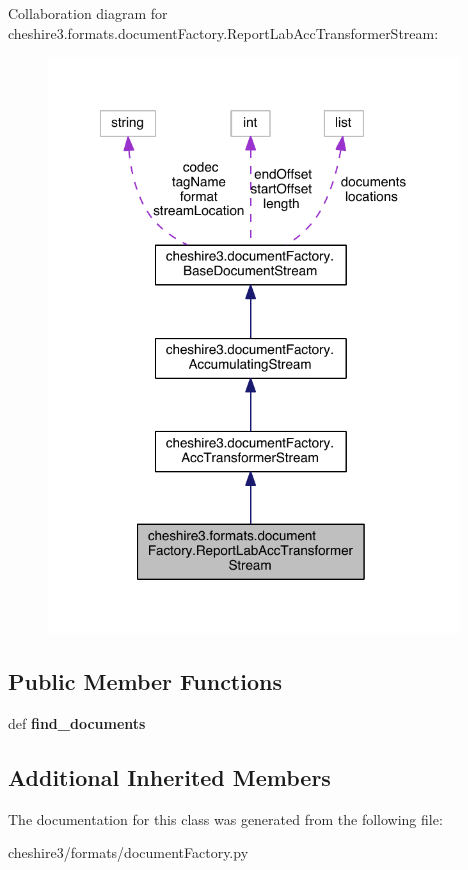 Collaboration diagram for cheshire3.\-formats.\-document\-Factory.\-Report\-Lab\-Acc\-Transformer\-Stream\-:
\nopagebreak
\begin{figure}[H]
\begin{center}
\leavevmode
\includegraphics[width=309pt]{classcheshire3_1_1formats_1_1document_factory_1_1_report_lab_acc_transformer_stream__coll__graph}
\end{center}
\end{figure}
\subsection*{Public Member Functions}
\begin{DoxyCompactItemize}
\item 
\hypertarget{classcheshire3_1_1formats_1_1document_factory_1_1_report_lab_acc_transformer_stream_a93cd43ed94ae31dd53e4341d51884c10}{def {\bfseries find\-\_\-documents}}\label{classcheshire3_1_1formats_1_1document_factory_1_1_report_lab_acc_transformer_stream_a93cd43ed94ae31dd53e4341d51884c10}

\end{DoxyCompactItemize}
\subsection*{Additional Inherited Members}


The documentation for this class was generated from the following file\-:\begin{DoxyCompactItemize}
\item 
cheshire3/formats/document\-Factory.\-py\end{DoxyCompactItemize}
